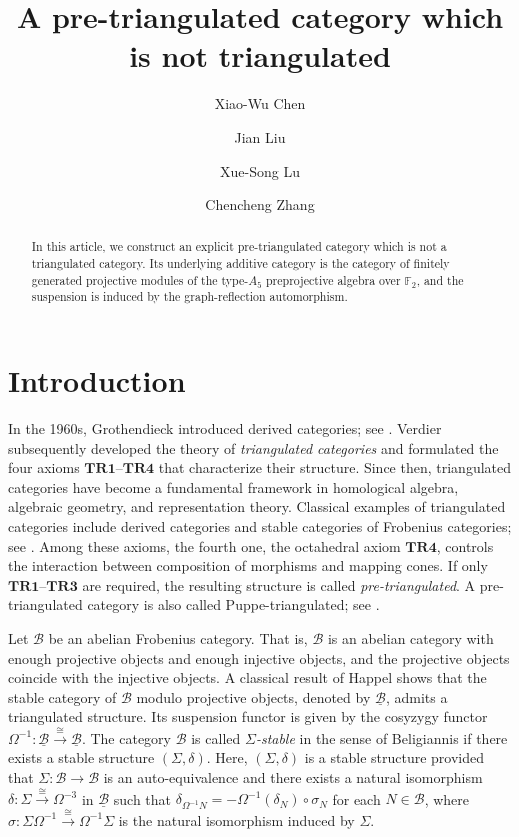 \documentclass[a4paper,reqno,10pt]{amsart}
\title[A pre-triangulated category which is not triangulated]
{A pre-triangulated category which is not triangulated}
\author{Xiao-Wu Chen}
\author{Jian Liu}
\author{Xue-Song Lu}
\author{Chencheng Zhang}
\numberwithin{equation}{section}
\begin{document}
\begin{abstract}
In this article, we construct an explicit pre-triangulated category which is not a triangulated category.  Its underlying additive category is the category of finitely generated projective modules of the type-$A_5$ preprojective algebra over $\mathbb F_2$, and the suspension is induced by the graph-reflection automorphism. 
\end{abstract}

\maketitle

\section{Introduction}

In the 1960s, Grothendieck introduced derived categories; see \cite{Hartshorne1966}. Verdier \cite{Verdier1977} subsequently developed the theory of \emph{triangulated categories} and formulated the four axioms $\mathbf{TR1}$--$\mathbf{TR4}$ that characterize their structure.
Since then, triangulated categories have become a fundamental framework in homological algebra,
algebraic geometry, and representation theory. Classical examples of triangulated categories
include derived categories and stable categories of Frobenius categories; see
\cite{Happel1988, Neeman2001}.
Among these axioms, the fourth one, the octahedral axiom $\mathbf{TR4}$, controls the interaction
between composition of morphisms and mapping cones.
If only $\mathbf{TR1}$--$\mathbf{TR3}$ are required, the resulting
structure is called \emph{pre-triangulated}. A pre-triangulated category is also called Puppe-triangulated; see \cite{Neeman2001, Puppe1967}.


Let $\mathcal B$ be an abelian Frobenius category. That is, $\mathcal B$ is an abelian category with enough projective objects and enough injective objects, and the projective objects coincide with the injective objects. A classical result of Happel \cite{Happel1988} shows that the stable category of $\mathcal B$ modulo projective objects, denoted by $\underline{\mathcal B}$, admits a triangulated structure. Its suspension functor is given by the cosyzygy functor
$\Omega^{-1}\colon \underline{\mathcal B}\xrightarrow \cong \underline{\mathcal B}$.
The category $\mathcal B$ is called \emph{$\Sigma$-stable} in the sense of Beligiannis \cite{Beligiannis2000} if there exists a stable structure $(\Sigma,\delta)$. Here, $(\Sigma,\delta)$ is a stable structure provided that $\Sigma\colon \mathcal B\to\mathcal B$ is an auto-equivalence and there exists a natural isomorphism
$\delta\colon \Sigma\xrightarrow \cong \Omega^{-3}$
in $\underline{\mathcal B}$ such that
$\delta_{\Omega^{-1} N}=-\Omega^{-1}(\delta_N)\circ \sigma_N$ for each $N\in \mathcal B$, where $\sigma: \Sigma\Omega^{-1}\xrightarrow \cong \Omega^{-1}\Sigma$ is the natural isomorphism induced by $\Sigma$.
\end{document}
